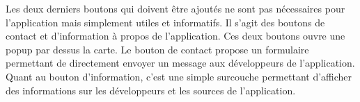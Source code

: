 Les deux derniers boutons qui doivent être ajoutés ne sont pas nécessaires pour l'application mais simplement utiles et informatifs. Il s'agit des boutons de contact et d'information à propos de l'application. Ces deux boutons ouvre une popup par dessus la carte. Le bouton de contact propose un formulaire permettant de directement envoyer un message aux développeurs de l'application. Quant au bouton d'information, c'est une simple surcouche permettant d'afficher des informations sur les développeurs et les sources de l'application.


